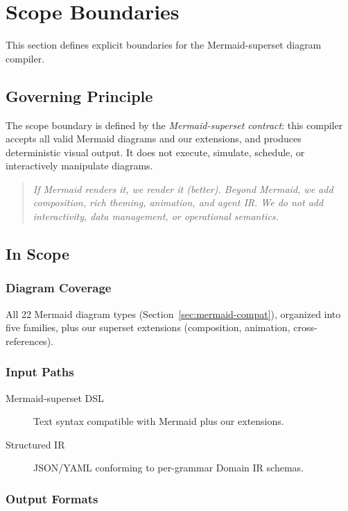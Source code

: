 \section{Scope Boundaries}
\label{sec:scope}

This section defines explicit boundaries for the Mermaid-superset diagram compiler.

\subsection{Governing Principle}

The scope boundary is defined by the \emph{Mermaid-superset contract}: this compiler accepts
all valid Mermaid diagrams and our extensions, and produces deterministic visual output.
It does not execute, simulate, schedule, or interactively manipulate diagrams.

\begin{quote}
\emph{If Mermaid renders it, we render it (better). Beyond Mermaid, we add composition,
rich theming, animation, and agent IR. We do not add interactivity, data management,
or operational semantics.}
\end{quote}

\subsection{In Scope}

\subsubsection{Diagram Coverage}

All 22 Mermaid diagram types (Section~\ref{sec:mermaid-compat}), organized into five families,
plus our superset extensions (composition, animation, cross-references).

\subsubsection{Input Paths}

\begin{description}
  \item[Mermaid-superset DSL] Text syntax compatible with Mermaid plus our extensions.
  \item[Structured IR] JSON/YAML conforming to per-grammar Domain IR schemas.
\end{description}

\subsubsection{Output Formats}


